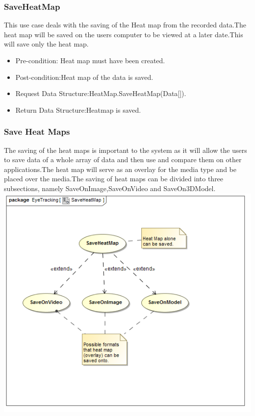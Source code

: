 \subsubsection{SaveHeatMap}
This use case deals with the saving of the Heat map from the recorded data.The heat map will be saved on the users computer to be viewed at a later date.This will save only the heat map.
\begin{itemize}
\item Pre-condition: Heat map must have been created.
\item Post-condition:Heat map of the data is saved.
\item Request Data Structure:HeatMap.SaveHeatMap(Data[]).
\item Return Data Structure:Heatmap is saved.
\end{itemize}
	
	
	
	\subsubsection{Save Heat Maps}
	The saving of the heat maps is important to the system as it will allow the users to save data of a whole array of data and then use and compare them on other applications.The heat map will serve as an overlay for the media type and be placed over the media.The saving of heat maps can be divided into three subsections, namely SaveOnImage,SaveOnVideo and SaveOn3DModel.
	\newline
		\includegraphics[scale=0.5]{Diagrams/Use_Case_Diagram__SaveHeatMap.png}
